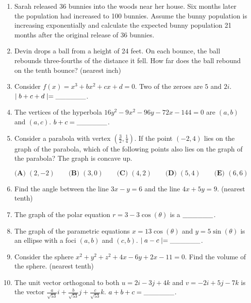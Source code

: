 \documentclass[../uilmath.tex]{subfiles}
\begin{document}
\begin{enumerate}[label=\bfseries\arabic*.]
    \item %
    Sarah released 36 bunnies into the woods near her house. Six months later the population had increased to 
    100 bunnies. Assume the bunny population is increasing exponentially and calculate the expected bunny population 21 months after the original release of 36 bunnies.

    \item %
    Devin drops a ball from a height of 24 feet. On each bounce, the ball rebounds three-fourths of the distance it fell. How far does the ball rebound on the tenth bounce? (nearest inch)

    \item %
    Consider $f(x)=x^3+bx^2+cx+d=0$. Two of the zeroes are $5$ and $2i$. $\mid b+c+d \mid=\_\_\_\_\_\_$.

    \item %
    The vertices of the hyperbola $16y^2-9x^2-96y-72x-144=0$ are $(a,b)$ and $(a,c)$. $b+c=\_\_\_\_\_\_$.

    \item %
    Consider a parabola with vertex $\left(\frac{3}{2},\frac{1}{4}\right)$. If the point 
    $(-2,4)$ lies on the graph of the parabola, which of the following points also lies on the graph of the parabola? The graph is concave up.

    $\textbf{(A) } (2,-2) \qquad \textbf{(B) } (3,0) \qquad \textbf{(C) } (4,2) \qquad \textbf{(D) } (5,4) \qquad \textbf{(E) } (6,6)$

    \item %
    Find the angle between the line $3x-y=6$ and the line $4x+5y=9$. (nearest tenth)

    \item %
    The graph of the polar equation $r=3-3\cos(\theta)$ is a $\_\_\_\_\_\_$.

    \item %
    The graph of the parametric equations $x=13\cos(\theta)$ and $y=5\sin(\theta)$ is an ellipse with a foci $(a,b)$ and $(c,b)$. $\mid a-c \mid = \_\_\_\_\_\_$.

    \item %
    Consider the sphere $x^2+y^2+z^2+4x-6y+2x-11=0$. Find the volume of the sphere. (nearest tenth)

    \item %
    The unit vector orthogonal to both $u=2i-3j+4k$ and $v=-2i+5j-7k$ is the vector 
    $\frac{a}{\sqrt{53}}i+\frac{b}{\sqrt{53}}j+\frac{c}{\sqrt{53}}k$. $a+b+c=\_\_\_\_\_\_$.


\end{enumerate}
\end{document}
